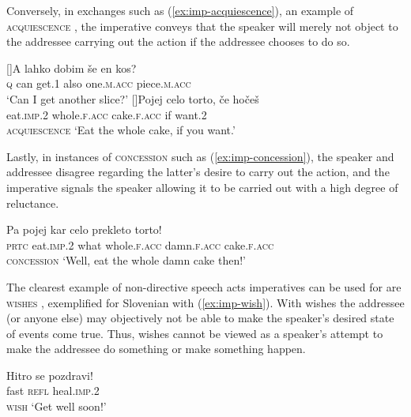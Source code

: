 \documentclass[output=paper,colorlinks,citecolor=brown]{langscibook}
\begin{document}
\noindent Conversely, in exchanges such as (\ref{ex:imp-acquiescence}), an example of \textsc{acquiescence} \citep{finteliatridou17}, the imperative conveys that the speaker will merely not object to the addressee carrying out the action if the addressee chooses to do so.
\begin{exe}
\ex \label{ex:imp-acquiescence} 
\begin{xlist}
[]{\gll A lahko dobim \v{s}e en kos?\\
           \textsc{q} can get.\textsc{1} also one.\textsc{m.acc} piece.\textsc{m.acc}\\
         \glt `Can I get another slice?'}
[]{\gll Pojej celo torto, \v{c}e ho\v{c}e\v{s}\\
                eat.\textsc{imp.2} whole.\textsc{f.acc} cake.\textsc{f.acc} if want.\textsc{2}\\ \hfill \textsc{acquiescence}%
        \glt `Eat the whole cake, if you want.'}
\end{xlist}
\end{exe}

\noindent Lastly, in instances of \textsc{concession} such as (\ref{ex:imp-concession}), the speaker and addressee disagree regarding the latter's desire to carry out the action, and the imperative signals the speaker allowing it to be carried out with a high degree of reluctance.%

\ea\gll Pa pojej kar celo prekleto torto!\\
         \textsc{prtc} eat.\textsc{imp.2} what whole.\textsc{f.acc} damn.\textsc{f.acc} cake.\textsc{f.acc}\\\hfill \textsc{concession}%
    \glt `Well, eat the whole damn cake then!' \label{ex:imp-concession}    
\z

\noindent The clearest example of non-directive speech acts imperatives can be used for are \textsc{wishes} \citep[][]{kaufmannBOOK}, exemplified for Slovenian with (\ref{ex:imp-wish}). With wishes the addressee (or anyone else) may objectively not be able to make the speaker's desired state of events come true. Thus, wishes cannot be viewed as a speaker's attempt to make the addressee do something or make something happen.

\ea\gll Hitro se pozdravi!\\
         fast  \textsc{refl} heal.\textsc{imp.2}\\\hfill \textsc{wish}%
     \glt `Get well soon!' \label{ex:imp-wish}
\z
\end{document}
